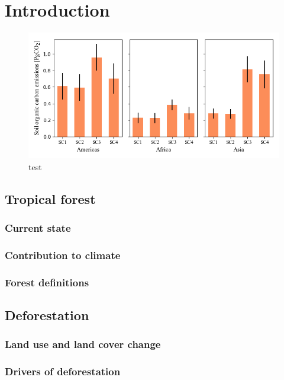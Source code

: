 \section{Introduction}
\label{sec:introduction}

\begin{figure}
	\centering
	\includegraphics[scale=0.8]{img/soc}
	\caption[list titel]{test}
	\label{fig:test}
\end{figure}

\subsection{Tropical forest}
\subsubsection{Current state}
\subsubsection{Contribution to climate}
\subsubsection{Forest definitions}
\subsection{Deforestation}
\subsubsection{Land use and land cover change}
\subsubsection{Drivers of deforestation}
